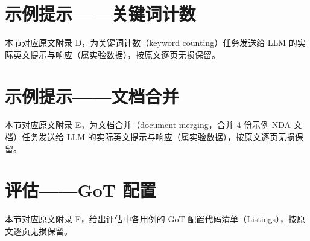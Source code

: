 \documentclass[11pt,UTF8,fontset=fandol]{ctexart}
\begin{document}
\clearpage
\section{示例提示——关键词计数}
本节对应原文附录 D，为关键词计数（keyword counting）任务发送给 LLM 的实际英文提示与响应（属实验数据），按原文逐页无损保留。


\clearpage
\section{示例提示——文档合并}
本节对应原文附录 E，为文档合并（document merging，合并 4 份示例 NDA 文档）任务发送给 LLM 的实际英文提示与响应（属实验数据），按原文逐页无损保留。


\clearpage
\section{评估——GoT 配置}
本节对应原文附录 F，给出评估中各用例的 GoT 配置代码清单（Listings），按原文逐页无损保留。

\end{document}

